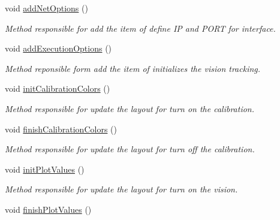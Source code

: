 \begin{DoxyCompactItemize}
\item 
\hypertarget{classMainWindow_ad4406d1714477f132de211c3351365cb}{void \hyperlink{classMainWindow_ad4406d1714477f132de211c3351365cb}{add\-Net\-Options} ()}\label{classMainWindow_ad4406d1714477f132de211c3351365cb}

\begin{DoxyCompactList}\small\item\em Method responsible for add the item of define I\-P and P\-O\-R\-T for interface. \end{DoxyCompactList}\item 
\hypertarget{classMainWindow_adb0b4159e334fb5b388a9eb1c4b8f5ca}{void \hyperlink{classMainWindow_adb0b4159e334fb5b388a9eb1c4b8f5ca}{add\-Execution\-Options} ()}\label{classMainWindow_adb0b4159e334fb5b388a9eb1c4b8f5ca}

\begin{DoxyCompactList}\small\item\em Method reponsible form add the item of initializes the vision tracking. \end{DoxyCompactList}\item 
\hypertarget{classMainWindow_ab514a3e2e2feb11fe562bb5f5687c260}{void \hyperlink{classMainWindow_ab514a3e2e2feb11fe562bb5f5687c260}{init\-Calibration\-Colors} ()}\label{classMainWindow_ab514a3e2e2feb11fe562bb5f5687c260}

\begin{DoxyCompactList}\small\item\em Method responsible for update the layout for turn on the calibration. \end{DoxyCompactList}\item 
\hypertarget{classMainWindow_aaed408509f0ec209d5113b6d838f223a}{void \hyperlink{classMainWindow_aaed408509f0ec209d5113b6d838f223a}{finish\-Calibration\-Colors} ()}\label{classMainWindow_aaed408509f0ec209d5113b6d838f223a}

\begin{DoxyCompactList}\small\item\em Method responsible for update the layout for turn off the calibration. \end{DoxyCompactList}\item 
\hypertarget{classMainWindow_afe574227eabad29af617957c1c74f11f}{void \hyperlink{classMainWindow_afe574227eabad29af617957c1c74f11f}{init\-Plot\-Values} ()}\label{classMainWindow_afe574227eabad29af617957c1c74f11f}

\begin{DoxyCompactList}\small\item\em Method responsible for update the layout for turn on the vision. \end{DoxyCompactList}\item 
\hypertarget{classMainWindow_a71bb19c8988c81c52cf8856295584ff5}{void \hyperlink{classMainWindow_a71bb19c8988c81c52cf8856295584ff5}{finish\-Plot\-Values} ()}\label{classMainWindow_a71bb19c8988c81c52cf8856295584ff5}


\end{DoxyCompactItemize}
